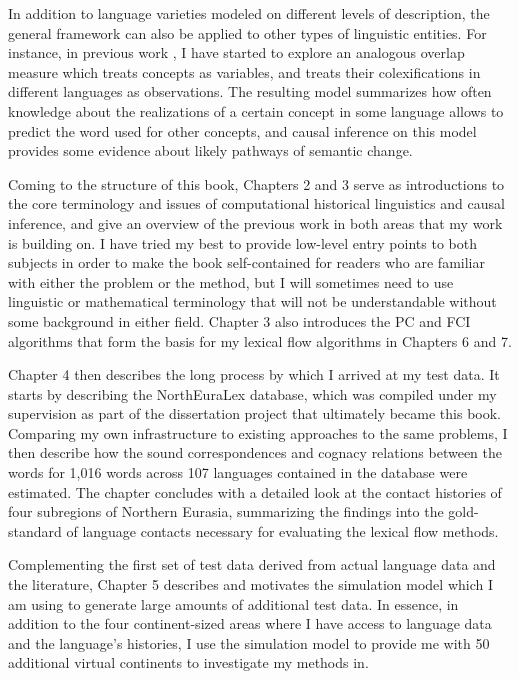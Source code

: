 In addition to language varieties modeled on different levels of description, the general framework can also be applied to other types of linguistic entities. For instance, in previous work \citep{dellert2016b}, I have started to explore an analogous overlap measure which treats concepts as variables, and treats their colexifications in different languages as observations. The resulting model summarizes how often knowledge about the realizations of a certain concept in some language allows to predict the word used for other concepts, and causal inference on this model provides some evidence about likely pathways of semantic change.

Coming to the structure of this book, Chapters 2 and 3 serve as introductions to the core terminology and issues of computational historical linguistics and causal inference, and give an overview of the previous work in both areas that my work is building on. I have tried my best to provide low-level entry points to both subjects in order to make the book self-contained for readers who are familiar with either the problem or the method, but I will sometimes need to use linguistic or mathematical terminology that will not be understandable without some background in either field. Chapter 3 also introduces the PC and FCI algorithms that form the basis for my lexical flow algorithms in Chapters 6 and 7.

Chapter 4 then describes the long process by which I arrived at my test data. It starts by describing the NorthEuraLex database, which was compiled under my supervision as part of the dissertation project that ultimately became this book. Comparing my own infrastructure to existing approaches to the same problems, I then describe how the sound correspondences and cognacy relations between the words for 1,016 words across 107 languages contained in the database were estimated. The chapter concludes with a detailed look at the contact histories of four subregions of Northern Eurasia, summarizing the findings into the gold-standard of language contacts necessary for evaluating the lexical flow methods.

Complementing the first set of test data derived from actual language data and the literature, Chapter 5 describes and motivates the simulation model which I am using to generate large amounts of additional test data. In essence, in addition to the four continent-sized areas where I have access to language data and the language's histories, I use the simulation model to provide me with 50 additional virtual continents to investigate my methods in.

